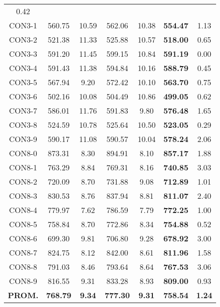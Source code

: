 \begin{table}[ht]
\begin{tabular}{c c c c c c c}
0.42\\CON3-1 & 560.75 & 10.59 & 
562.06 & 10.38 & \bf{554.47} & 
1.13\\CON3-2 & 521.38 & 11.33 & 
525.88 & 10.57 & \bf{518.00} & 
0.65\\CON3-3 & 591.20 & 11.45 & 
599.15 & 10.84 & \bf{591.19} & 
0.00\\CON3-4 & 591.43 & 11.38 & 
594.84 & 10.16 & \bf{588.79} & 
0.45\\CON3-5 & 567.94 & 9.20 & 
572.42 & 10.10 & \bf{563.70} & 
0.75\\CON3-6 & 502.16 & 10.08 & 
504.49 & 10.86 & \bf{499.05} & 
0.62\\CON3-7 & 586.01 & 11.76 & 
591.83 & 9.80 & \bf{576.48} & 
1.65\\CON3-8 & 524.59 & 10.78 & 
525.64 & 10.50 & \bf{523.05} & 
0.29\\CON3-9 & 590.17 & 11.08 & 
590.57 & 10.04 & \bf{578.24} & 
2.06\\CON8-0 & 873.31 & 8.30 & 
894.91 & 8.10 & \bf{857.17} & 
1.88\\CON8-1 & 763.29 & 8.84 & 
769.31 & 8.16 & \bf{740.85} & 
3.03\\CON8-2 & 720.09 & 8.70 & 
731.88 & 9.08 & \bf{712.89} & 
1.01\\CON8-3 & 830.53 & 8.76 & 
837.94 & 8.81 & \bf{811.07} & 
2.40\\CON8-4 & 779.97 & 7.62 & 
786.59 & 7.79 & \bf{772.25} & 
1.00\\CON8-5 & 758.84 & 8.70 & 
772.86 & 8.34 & \bf{754.88} & 
0.52\\CON8-6 & 699.30 & 9.81 & 
706.80 & 9.28 & \bf{678.92} & 
3.00\\CON8-7 & 824.75 & 8.12 & 
842.00 & 8.61 & \bf{811.96} & 
1.58\\CON8-8 & 791.03 & 8.46 & 
793.64 & 8.64 & \bf{767.53} & 
3.06\\CON8-9 & 816.55 & 9.31 & 
833.28 & 8.93 & \bf{809.00} & 
0.93\\\bf{PROM.} & 
\bf{768.79} & \bf{9.34} & \bf{777.30} & \bf{9.31} & \bf{758.54} & \bf{1.24}\\[1ex]\hline
\end{tabular}
\label{table:nonlin}
\end{table} \clearpage
